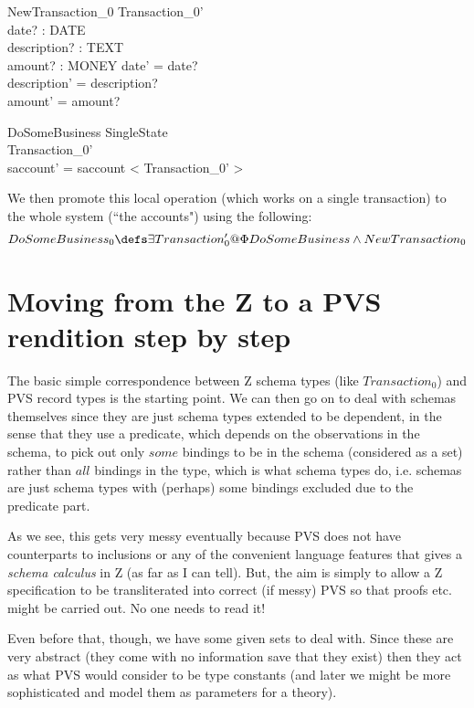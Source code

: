 \documentclass[11pt]{amsart}
\begin{document}
\begin{schema}{NewTransaction_0}
Transaction_0'\\
date? : DATE\\
description? : TEXT\\
amount? : MONEY
\where
date' = date?\\
description' = description?\\
amount' = amount?
\end{schema}

\begin{schema}{\Phi DoSomeBusiness}
\Delta SingleState\\
Transaction_0'\\
\where
saccount' = saccount \cat < \theta Transaction_0' >
\end{schema}

We then promote this local operation (which works on a single transaction) to the whole system (``the accounts") using the following:
\[
DoSomeBusiness_0 \defs \exists Transaction_0' @ \Phi DoSomeBusiness \land New Transaction_0
\]

\section{Moving from the Z to a PVS rendition step by step}

The basic simple correspondence between Z schema types (like $Transaction_0$) and PVS record types is the starting point. We can then go on to deal with schemas themselves since they are just schema types extended to be dependent, in the sense that they use a predicate, which depends on the observations in the schema, to pick out only $some$ bindings to be in the schema (considered as a set) rather than $all$ bindings in the type, which is what schema types do, i.e. schemas are just schema types with (perhaps) some bindings excluded due to the predicate part.

As we see, this gets very messy eventually because PVS does not have counterparts to inclusions or any of the convenient language features that gives a \emph{schema calculus} in Z (as far as I can tell). But, the aim is simply to allow a Z specification to be transliterated into correct (if messy) PVS so that proofs etc. might be carried out. No one needs to read it!

Even before that, though, we have some given sets to deal with. Since these are very abstract (they come with no information save that they exist) then they act as what PVS would consider to be type constants (and later we might be more sophisticated and model them as parameters for a theory).
\end{document}
